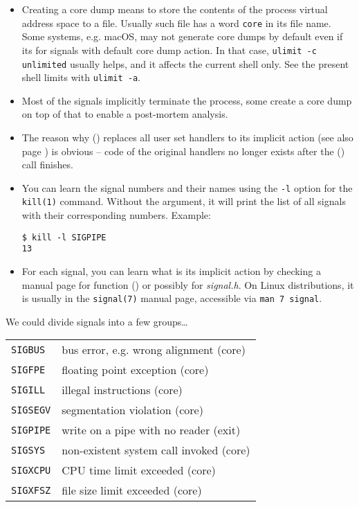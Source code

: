 \begin{itemize}
\item Creating a core dump means to store the contents of the process virtual
address space to a file.  Usually such file has a word \texttt{core} in its
file name. Some systems, e.g. macOS, may not generate core dumps by default even
if its for signals with default core dump action.  In that case,
\texttt{ulimit -c unlimited} usually helps, and it affects the current shell
only.  See the present shell limits with \texttt{ulimit -a}.
\item Most of the signals implicitly terminate the process, some create a core
dump on top of that to enable a post-mortem analysis.
\item The reason why () replaces all user set handlers to its
implicit action (see also page \pageref{EXEC}) is obvious -- code of the
original handlers no longer exists after the () call finishes.
\item You can learn the signal numbers and their names using the \texttt{-l}
option for the \texttt{kill(1)} command.  Without the argument, it will print
the list of all signals with their corresponding numbers.  Example:

\begin{verbatim}
$ kill -l SIGPIPE
13
\end{verbatim}
\item For each signal, you can learn what is its implicit action by checking a
manual page for function () or possibly for \emph{signal.h}.  On
Linux distributions, it is usually in the \texttt{signal(7)} manual page,
accessible via \texttt{man 7 signal}.
\end{itemize}



\begin{slide}

We could divide signals into a few groups\dots


\begin{tabular}{ll}
\texttt{SIGBUS} & bus error, e.g. wrong alignment (core) \\
\texttt{SIGFPE} & floating point exception (core) \\
\texttt{SIGILL} & illegal instructions (core) \\
\texttt{SIGSEGV} & segmentation violation (core) \\
\texttt{SIGPIPE} & write on a pipe with no reader (exit) \\
\texttt{SIGSYS} & non-existent system call invoked (core) \\
\texttt{SIGXCPU} & CPU time limit exceeded (core) \\
\texttt{SIGXFSZ} & file size limit exceeded (core)\\
\end{tabular}
\end{slide}

